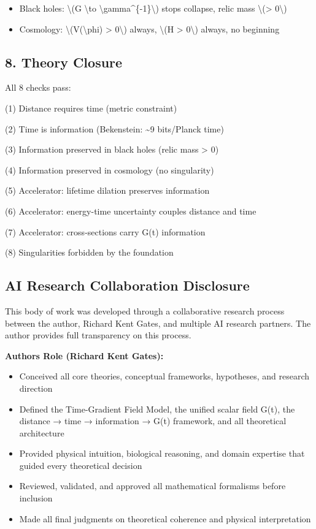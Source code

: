 \documentclass[
  10pt,
]{article}
\providecommand{\tightlist}{%
  \setlength{\itemsep}{0pt}\setlength{\parskip}{0pt}}
\begin{document}
\begin{itemize}
\tightlist
\item
  Black holes: \textbackslash(G \textbackslash to
  \textbackslash gamma\^{}\{-1\}\textbackslash) stops collapse, relic
  mass \textbackslash(\textgreater{} 0\textbackslash)
\item
  Cosmology: \textbackslash(V(\textbackslash phi) \textgreater{}
  0\textbackslash) always, \textbackslash(H \textgreater{}
  0\textbackslash) always, no beginning
\end{itemize}

\hypertarget{theory-closure}{%
\subsection{8. Theory Closure}\label{theory-closure}}

All 8 checks pass:

(1) Distance requires time (metric constraint)

(2) Time is information (Bekenstein: \textasciitilde9 bits/Planck time)

(3) Information preserved in black holes (relic mass \textgreater{} 0)

(4) Information preserved in cosmology (no singularity)

(5) Accelerator: lifetime dilation preserves information

(6) Accelerator: energy-time uncertainty couples distance and time

(7) Accelerator: cross-sections carry G(t) information

(8) Singularities forbidden by the foundation

\hypertarget{ai-research-collaboration-disclosure}{%
\subsection{AI Research Collaboration
Disclosure}\label{ai-research-collaboration-disclosure}}

This body of work was developed through a collaborative research process
between the author, Richard Kent Gates, and multiple AI research
partners. The author provides full transparency on this process.

\textbf{Author\textquotesingle s Role (Richard Kent Gates):}

\begin{itemize}
\tightlist
\item
  Conceived all core theories, conceptual frameworks, hypotheses, and
  research direction
\item
  Defined the Time-Gradient Field Model, the unified scalar field G(t),
  the distance → time → information → G(t) framework, and all
  theoretical architecture
\item
  Provided physical intuition, biological reasoning, and domain
  expertise that guided every theoretical decision
\item
  Reviewed, validated, and approved all mathematical formalisms before
  inclusion
\item
  Made all final judgments on theoretical coherence and physical
  interpretation
\end{itemize}
\end{document}
